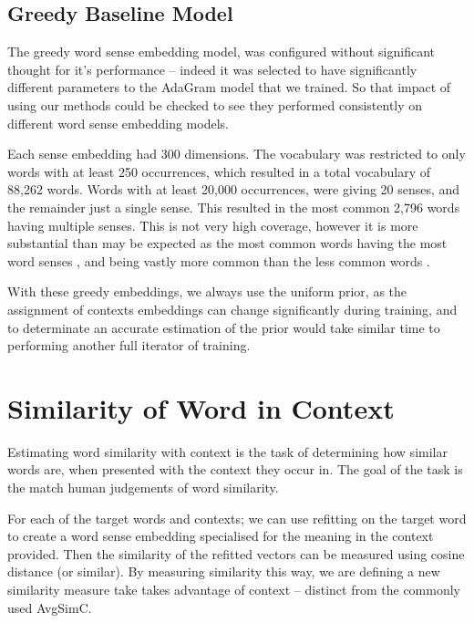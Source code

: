 \documentclass{sig-alternate}
\begin{document}
\subsection{Greedy Baseline Model}
The greedy word sense embedding model, was configured without significant thought for it's performance -- indeed it was selected to have significantly different parameters to the AdaGram model that we trained. So that impact of using our methods could be checked to see they performed consistently on different word sense embedding models.

Each sense embedding had 300 dimensions.
The vocabulary was restricted to only words with at least 250 occurrences, which resulted in a total vocabulary of 88,262 words. Words with at least 20,000 occurrences, were giving 20 senses, and the remainder just a single sense. This resulted in the most common 2,796 words having multiple senses. This is not very high coverage, however it is more substantial than may be expected as the most common words having the most word senses \parencite{zipf1945meaning}, and being vastly more common than the less common words \parencite{zipf1949human,gilmour2005understanding}.

With these greedy embeddings, we always use the uniform prior, as the assignment of contexts embeddings can change significantly during training, and to determinate an accurate estimation of the prior would take similar time to performing another full iterator of training.



\section{Similarity of Word in Context} \label{SimilarityInContext}
Estimating word similarity with context is the task of determining how similar words are, when presented with the context they occur in. The goal of the task is the match human judgements of word similarity.

For each of the target words and contexts; we can use refitting on the target word to create a word sense embedding specialised for the meaning in the context provided. Then the similarity of the refitted vectors can be measured using cosine distance (or similar).
By measuring similarity this way, we are defining a new similarity measure take takes advantage of context -- distinct from the commonly used AvgSimC.
\end{document}
